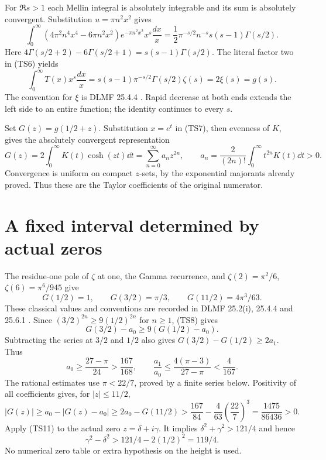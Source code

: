 For $\Re s>1$ each Mellin integral is absolutely integrable and its
sum is absolutely convergent. Substitution $u=\pi n^2x^2$ gives
\[
 \int_0^\infty(4\pi^2n^4x^4-6\pi n^2x^2)e^{-\pi n^2x^2}x^s\frac{dx}{x}
 =\frac12\pi^{-s/2}n^{-s}s(s-1)\Gamma(s/2).
\]
Here $4\Gamma(s/2+2)-6\Gamma(s/2+1)=s(s-1)\Gamma(s/2)$.
The literal factor two in (TS6) yields
\begin{equation}\tag{TS7}
 \int_0^\infty T(x)x^s\frac{dx}{x}
 =s(s-1)\pi^{-s/2}\Gamma(s/2)\zeta(s)=2\xi(s)=g(s).
\end{equation}
The convention for $\xi$ is DLMF 25.4.4 \cite{a02ts:zeta}.
Rapid decrease at both ends extends the left side to an entire
function; the identity continues to every $s$.

Set $G(z)=g(1/2+z)$. Substitution $x=e^t$ in (TS7), then evenness
of $K$, gives the absolutely convergent representation
\begin{equation}\tag{TS8}
 G(z)=2\int_0^\infty K(t)\cosh(zt)\dd t
 =\sum_{n=0}^\infty a_nz^{2n},\qquad
 a_n=\frac2{(2n)!}\int_0^\infty t^{2n}K(t)\dd t>0.
\end{equation}
Convergence is uniform on compact $z$-sets, by the exponential
majorants already proved. Thus these are the Taylor coefficients
of the original numerator.

\section{A fixed interval determined by actual zeros}
The residue-one pole of $\zeta$ at one, the Gamma recurrence, and
$\zeta(2)=\pi^2/6$, $\zeta(6)=\pi^6/945$ give
\begin{equation}\tag{TS9}
 G(1/2)=1,\qquad G(3/2)=\pi/3,\qquad G(11/2)=4\pi^3/63.
\end{equation}
These classical values and conventions are recorded in DLMF
25.2(i), 25.4.4 and 25.6.1 \cite{a02ts:zeta,a02ts:zetavalues}.
Since $(3/2)^{2n}\geq9(1/2)^{2n}$ for $n\geq1$, (TS8) gives
\[
 G(3/2)-a_0\geq9(G(1/2)-a_0).
\]
Subtracting the series at $3/2$ and $1/2$ also gives
$G(3/2)-G(1/2)\geq2a_1$. Thus
\begin{equation}\tag{TS10}
 a_0\geq\frac{27-\pi}{24}>\frac{167}{168},\qquad
 \frac{a_1}{a_0}\leq\frac{4(\pi-3)}{27-\pi}<\frac4{167}.
\end{equation}
The rational estimates use $\pi<22/7$, proved by a finite series
below. Positivity of all coefficients gives, for $|z|\leq11/2$,
\begin{equation}\tag{TS11}
 |G(z)|\geq a_0-|G(z)-a_0|
 \geq2a_0-G(11/2)
 >\frac{167}{84}-\frac4{63}\left(\frac{22}{7}\right)^3
 =\frac{1475}{86436}>0.
\end{equation}
Apply (TS11) to the actual zero $z=\delta+i\gamma$. It implies
$\delta^2+\gamma^2>121/4$ and hence
\begin{equation}\tag{TS12}
 \gamma^2-\delta^2>121/4-2(1/2)^2=119/4.
\end{equation}
No numerical zero table or extra hypothesis on the height is used.

